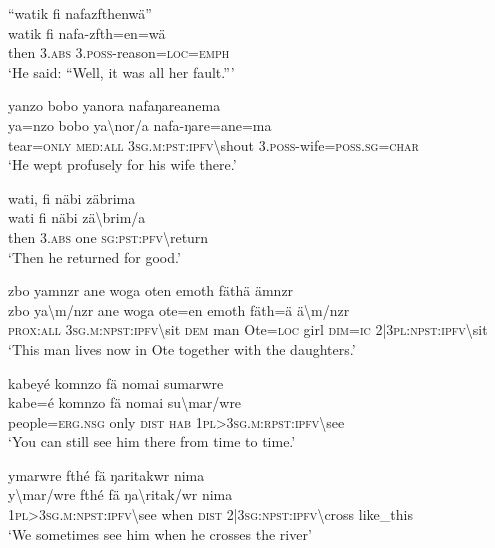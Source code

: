 \ea\label{ex:7:a4863}
``watik fi nafazfthenwä''\\
\gll watik	fi	nafa-zfth=en=wä\\
     then	3.\textsc{abs}	3.\textsc{poss}-reason=\textsc{loc}=\textsc{emph}\\
\glt `He said: ``Well, it was all her fault.'''
\z

\ea\label{ex:7:a4864}
yanzo bobo yanora nafaŋareanema\\
\gll ya=nzo	bobo	ya{\textbackslash}nor/a	nafa-ŋare=ane=ma\\
     tear=\textsc{only}	\textsc{med}:\textsc{all}	3\textsc{sg}.\textsc{m}:\textsc{pst}:\textsc{ipfv}{\textbackslash}shout	3.\textsc{poss}-wife=\textsc{poss}.\textsc{sg}=\textsc{char}\\
\glt `He wept profusely for his wife there.'
\z

\ea\label{ex:7:a4866}
wati, fi näbi zäbrima\\
\gll wati	fi	näbi	zä{\textbackslash}brim/a\\
     then	3.\textsc{abs}	one	\textsc{sg}:\textsc{pst}:\textsc{pfv}{\textbackslash}return\\
\glt `Then he returned for good.'
\z

\ea\label{ex:7:a4867}
zbo yamnzr ane woga oten emoth fäthä ämnzr\\
\gll zbo	ya{\textbackslash}m/nzr	ane	woga	ote=en	emoth	fäth=ä	ä{\textbackslash}m/nzr\\
     \textsc{prox}:\textsc{all}	3\textsc{sg}.\textsc{m}:\textsc{npst}:\textsc{ipfv}{\textbackslash}sit	\textsc{dem}	man	Ote=\textsc{loc}	girl	\textsc{dim}=\textsc{ic}	2|3\textsc{pl}:\textsc{npst}:\textsc{ipfv}{\textbackslash}sit\\
\glt `This man lives now in Ote together with the daughters.'
\z

\ea\label{ex:7:a4870}
kabeyé komnzo fä nomai sumarwre\\
\gll kabe=é	komnzo	fä	nomai	su{\textbackslash}mar/wre\\
     people=\textsc{erg}.\textsc{nsg}	only	\textsc{dist}	\textsc{hab}	1\textsc{pl}>3\textsc{sg}.\textsc{m}:\textsc{rpst}:\textsc{ipfv}{\textbackslash}see\\
\glt `You can still see him there from time to time.'
\z

\ea\label{ex:7:a4871}
ymarwre fthé fä ŋaritakwr nima\\
\gll y{\textbackslash}mar/wre	fthé	fä	ŋa{\textbackslash}ritak/wr	nima\\
     1\textsc{pl}>3\textsc{sg}.\textsc{m}:\textsc{npst}:\textsc{ipfv}{\textbackslash}see	when	\textsc{dist}	2|3\textsc{sg}:\textsc{npst}:\textsc{ipfv}{\textbackslash}cross	like\_this\\
\glt `We sometimes see him when he crosses the river'
\z

